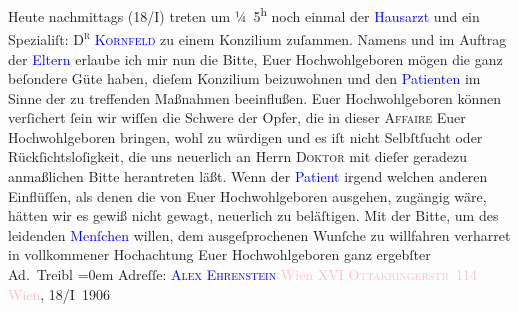            \pstart
           Heute{ }nachmittags (18/I) treten um ¼ 5\textsuperscript{h} noch einmal der \textcolor{blue}{Hausarzt}{} und ein Spezialiſt: \textsc{D\textsuperscript{r}{ }\textcolor{blue}{Kornfeld}{}\ledrightnote{\textcolor{blue}{Sigmund Kornfeld}}} zu einem Konzilium zuſammen. Namens und im Auftrag der \textcolor{blue}{Eltern}{} erlaube ich mir nun die Bitte, Euer
               Hochwohlgeboren mögen die ganz beſondere Güte haben, {\pb}dieſem Konzilium beizuwohnen und den \textcolor{blue}{Patienten}{} im Sinne der zu treffenden Maßnahmen
               beeinflußen.\pend
           \pstart
           Euer Hochwohlgeboren können verſichert ſein wir wiſſen die Schwere der Opfer, die in
               dieser \textsc{Affaire} Euer Hochwohlgeboren bringen, wohl zu
               würdigen und es iſt nicht Selbſtſucht oder Rückſichtsloſigkeit, die uns neuerlich an
               Herrn \textsc{Doktor} mit dieſer geradezu anmaßlichen Bitte
               herantreten läßt. Wenn der \textcolor{blue}{Patient}{} irgend welchen anderen Einflüſſen, als denen die von Euer
               Hochwohlgeboren ausgehen, zugängig wäre, hätten wir es gewiß nicht {\pb}gewagt, neuerlich zu beläſtigen.\pend
           \pstart
           Mit der Bitte, um des leidenden \textcolor{blue}{Menſchen}{} willen, dem ausgeſprochenen Wunſche zu willfahren verharret in
               vollkommener Hochachtung\pend
           \pstart
           Euer Hochwohlgeboren ganz ergebſter{\\[\baselineskip]}\spacefill\mbox{Ad. Treibl}\pend
           \leftskip=0em{}\pstart
           \noindent{}Adreſſe: \textcolor{blue}{\textsc{Alex Ehrenstein}}{}\ledrightnote{\textcolor{blue}{Alexander Ehrenstein}}\pend
           \pstart
           \textcolor{pink}{Wien XVI}{}\ledrightnote{\textcolor{pink}{XVI., Ottakring}}\pend
           \pstart
           \textcolor{pink}{\textsc{Ottakringerstr} 114}{}\ledrightnote{\textcolor{pink}{Ottakringerstraße}}\pend
           \pstart
           \textcolor{pink}{Wien}{}\ledrightnote{\textcolor{pink}{Wien}}, 18/I 1906\pend
           \endnumbering{}  
      